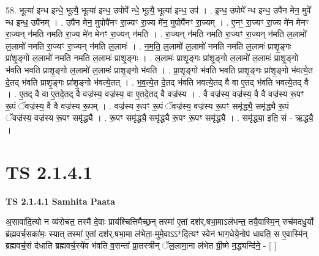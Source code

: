 \documentclass[17pt]{extarticle}
\begin{document}
58. भूत्या॑ इन्ध इन्धे॒ भूत्यै॒ भूत्या॑ इन्ध॒ उपोपे᳚ न्धे॒ भूत्यै॒ भूत्या॑ इन्ध॒ उप॑ । . इ॒न्ध॒ उपोपे᳚ न्ध इन्ध॒ उपै॑न मेन॒ मुपे᳚ न्ध इन्ध॒ उपै॑नम् । . उपै॑न मेन॒ मुपोपै॑नꣳ रा॒ज्यꣳ रा॒ज्य मे॑न॒ मुपोपै॑नꣳ रा॒ज्यम् । . ए॒नꣳ॒॒ रा॒ज्यꣳ रा॒ज्य मे॑न मेनꣳ रा॒ज्यन् न॑मति नमति रा॒ज्य मे॑न मेनꣳ रा॒ज्यन् न॑मति । . रा॒ज्यन् न॑मति नमति रा॒ज्यꣳ रा॒ज्यन् न॑मति ल॒लामो॑ ल॒लामो॑ नमति रा॒ज्यꣳ रा॒ज्यन् न॑मति ल॒लामः॑ । . न॒म॒ति॒ ल॒लामो॑ ल॒लामो॑ नमति नमति ल॒लामः॑ प्राशृ॒ङ्गः प्रा॑शृ॒ङ्गो ल॒लामो॑ नमति नमति ल॒लामः॑ प्राशृ॒ङ्गः । . ल॒लामः॑ प्राशृ॒ङ्गः प्रा॑शृ॒ङ्गो ल॒लामो॑ ल॒लामः॑ प्राशृ॒ङ्गो भ॑वति भवति प्राशृ॒ङ्गो ल॒लामो॑ ल॒लामः॑ प्राशृ॒ङ्गो भ॑वति । . प्रा॒शृ॒ङ्गो भ॑वति भवति प्राशृ॒ङ्गः प्रा॑शृ॒ङ्गो भ॑वत्ये॒त दे॒तद् भ॑वति प्राशृ॒ङ्गः प्रा॑शृ॒ङ्गो भ॑वत्ये॒तत् । . भ॒व॒त्ये॒त दे॒तद् भ॑वति भवत्ये॒तद् वै वा ए॒तद् भ॑वति भवत्ये॒तद् वै । . ए॒तद् वै वा ए॒तदे॒तद् वै वज्र॑स्य॒ वज्र॑स्य॒ वा ए॒तदे॒तद् वै वज्र॑स्य । . वै वज्र॑स्य॒ वज्र॑स्य॒ वै वै वज्र॑स्य रू॒पꣳ रू॒पं ॅवज्र॑स्य॒ वै वै वज्र॑स्य रू॒पम् । . वज्र॑स्य रू॒पꣳ रू॒पं ॅवज्र॑स्य॒ वज्र॑स्य रू॒पꣳ समृ॑द्ध्यै॒ समृ॑द्ध्यै रू॒पं ॅवज्र॑स्य॒ वज्र॑स्य रू॒पꣳ समृ॑द्ध्यै । . रू॒पꣳ समृ॑द्ध्यै॒ समृ॑द्ध्यै रू॒पꣳ रू॒पꣳ समृ॑द्ध्यै । . समृ॑द्ध्या॒ इति॒ सं - ऋ॒द्ध्यै॒ । \newline
\pagebreak
{}
\section*{ TS 2.1.4.1 }

\textbf{TS 2.1.4.1 } \newline
\textbf{Samhita Paata} \newline

अ॒सावा॑दि॒त्यो न व्य॑रोचत॒ तस्मै॑ दे॒वाः प्राय॑श्चित्तिमैच्छ॒न् तस्मा॑ ए॒तां दश॑र्.षभा॒माऽल॑भन्त॒ तयै॒वास्मि॒न् रुच॑मदधु॒र्यो ब्र॑ह्मवर्च॒सका॑मः॒ स्यात् तस्मा॑ ए॒तां दश॑र्.षभा॒मा ल॑भेता॒-मुमे॒वाऽऽ*दि॒त्यꣳ स्वेन॑ भाग॒धेये॒नोप॑ धावति॒ स ए॒वास्मि॑न् ब्रह्मवर्च॒सं द॑धाति ब्रह्मवर्च॒स्ये॑व भ॑वति व॒सन्ता᳚ प्रा॒तस्त्रीन् ॅल॒लामा॒ना ल॑भेत ग्री॒ष्मे म॒द्ध्यन्दि॑ने॒ - [  ] \newline
\end{document}
